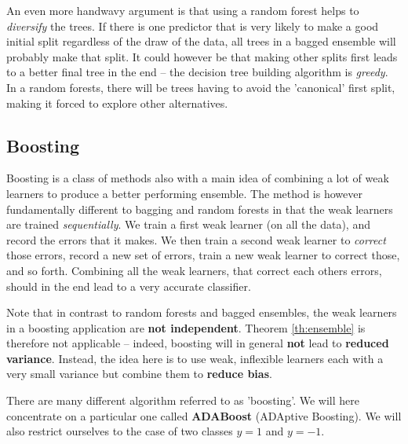 \documentclass{article}
\begin{document}
An even more handwavy argument is that using a random forest helps to \emph{diversify} the trees. If there is one predictor that is very likely to make a good initial split regardless of the draw of the data, all trees in a bagged ensemble will probably make that split. It could however be that making other splits first leads to a better final tree in the end -- the decision tree building algorithm is \emph{greedy}. In a random forests, there will be trees having to avoid the 'canonical' first split, making it forced to explore other alternatives.

\subsection{Boosting} Boosting is a class of methods also with a main idea of combining a lot of weak learners to produce a better performing ensemble. The method is however fundamentally different to bagging and random forests in that the weak learners are trained \emph{sequentially}. We train a first weak learner (on all the data), and record the errors that it makes. We then train a second weak learner to \emph{correct} those errors, record a new set of errors, train a new weak learner to correct those, and so forth. Combining all the weak learners, that correct each others errors, should in the end lead to a very accurate classifier.

Note that in contrast to random forests and bagged ensembles, the weak learners in a boosting application are \textbf{not independent}. Theorem \ref{th:ensemble} is therefore not applicable -- indeed, boosting will in general \textbf{not} lead to \textbf{reduced variance}. Instead, the idea here is to use weak, inflexible learners each with a very small variance but combine them to \textbf{reduce bias}. \newline

There are many different algorithm referred to as 'boosting'. We will here concentrate on a particular one called \textbf{ADABoost} (ADAptive Boosting). We will also restrict ourselves to the case of two classes $y=1$ and $y=-1$. 
\end{document}
